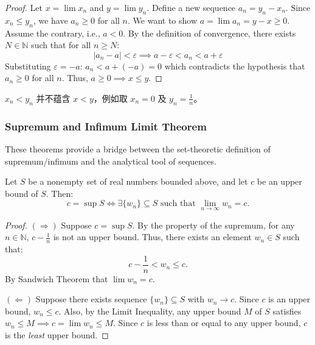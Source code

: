 \documentclass[
	UTF-8,
	11pt, %
	a4paper, %
]{LegrandOrangeBook}
\begin{document}
    \begin{proof}
    Let $x = \lim x_n$ and $y = \lim y_n$. Define a new sequence $a_n = y_n - x_n$.
    Since $x_n \le y_n$, we have $a_n \ge 0$ for all $n$.
    We want to show $a = \lim a_n = y - x \ge 0$.
    Assume the contrary, i.e., $a < 0$. 
    By the definition of convergence, there exists $N \in \mathbb{N}$ such that for all $n \ge N$:
    \[ |a_n - a| < \varepsilon \implies a - \varepsilon < a_n < a + \varepsilon \]
    Substituting $\varepsilon = -a$:
    $ a_n < a + (-a) = 0 $
    which contradicts the hypothesis that $a_n \ge 0$ for all $n$. Thus, $a \ge 0 \implies x \le y$.
    \end{proof}

    \begin{remark}
        $x_n < y_n$ 并不蕴含 $x<y$，例如取 $x_n = 0$ 及 $y_n = \frac{1}{n}$。
    \end{remark}

    \subsubsection{Supremum and Infimum Limit Theorem}

    These theorems provide a bridge between the set-theoretic definition of supremum/infimum and the analytical tool of sequences.

    \begin{theorem}
    Let $S$ be a nonempty set of real numbers bounded above, and let $c$ be an upper bound of $S$. Then:
    \[ c = \sup S \iff \exists \{w_n\} \subseteq S \text{ such that } \lim_{n \to \infty} w_n = c. \]
    \end{theorem}

    \begin{proof}
    $(\Rightarrow)$ Suppose $c = \sup S$.
    By the property of the supremum, for any $n \in \mathbb{N}$, $c - \frac{1}{n}$ is not an upper bound. Thus, there exists an element $w_n \in S$ such that:
    \[ c - \frac{1}{n} < w_n \le c. \]
    By Sandwich Theorem that $\lim w_n = c$.

    $(\Leftarrow)$ Suppose there exists sequence $\{w_n\} \subseteq S$ with $w_n \to c$.
    Since $c$ is an upper bound, $w_n \le c$. Also, by the Limit Inequality, any upper bound $M$ of $S$ satisfies $w_n \le M \implies c = \lim w_n \le M$.
    Since $c$ is less than or equal to any upper bound, $c$ is the \textit{least} upper bound.
    \end{proof}
\end{document}
